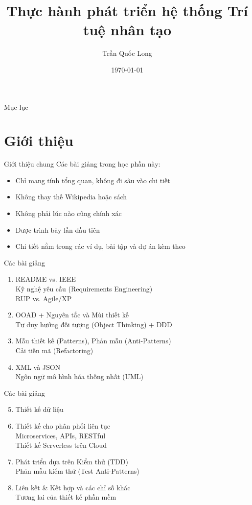 \documentclass{beamer}
\title{Thực hành phát triển hệ thống Trí tuệ nhân tạo}
\author{Trần Quốc Long}
\institute{Trường ĐH Công nghệ, ĐHQG Hà Nội}
\date{\today}
\begin{document}
\begin{frame}
    \titlepage
\end{frame}

\begin{frame}{Mục lục}
    \tableofcontents
\end{frame}

\section{Giới thiệu}

\begin{frame}{Giới thiệu chung}
    Các bài giảng trong học phần này:
    \begin{itemize}
        \item Chỉ mang tính tổng quan, không đi sâu vào chi tiết
        \item Không thay thế Wikipedia hoặc sách
        \item Không phải lúc nào cũng chính xác
        \item Được trình bày lần đầu tiên
        \item Chi tiết nằm trong các ví dụ, bài tập và dự án kèm theo
    \end{itemize}
\end{frame}

\begin{frame}{Các bài giảng}
    \begin{enumerate}
        \item README vs. IEEE
        \\ Kỹ nghệ yêu cầu (Requirements Engineering)
        \\ RUP vs. Agile/XP
        \item OOAD + Nguyên tắc và Mùi thiết kế
        \\ Tư duy hướng đối tượng (Object Thinking) + DDD
        \item Mẫu thiết kế (Patterns), Phản mẫu (Anti-Patterns)\\Cải tiến mã (Refactoring)
        \item XML và JSON
        \\ Ngôn ngữ mô hình hóa thống nhất (UML)
    \end{enumerate}        
\end{frame}


\begin{frame}{Các bài giảng}
    \begin{enumerate}
        \setcounter{enumi}{4}
        \item Thiết kế dữ liệu
        \item Thiết kế cho phân phối liên tục
        \\Microservices, APIs, RESTful
        \\Thiết kế Serverless trên Cloud
        \item Phát triển dựa trên Kiểm thử (TDD)
        \\Phản mẫu kiểm thử (Test Anti-Patterns)
        \item Liên kết \& Kết hợp và các chỉ số khác
        \\Tương lai của thiết kế phần mềm
    \end{enumerate}        
\end{frame}
\end{document}
